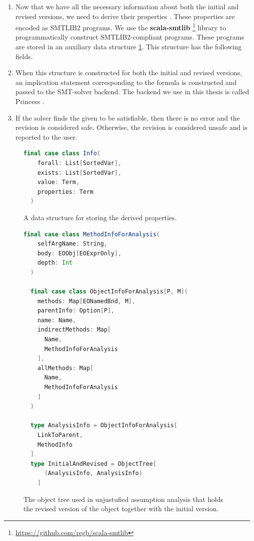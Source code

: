 \begin{enumerate}
  \item Now that we have all the necessary information about both the initial and revised versions, we need to derive their properties . These properties are encoded as SMTLIB2 \cite{smtlib} programs. We use the \textbf{scala-smtlib} \footnote{\url{https://github.com/regb/scala-smtlib}} library to programmatically construct SMTLIB2-compliant programs. These programs are stored in an auxiliary data structure \ref{fig:property_structure}. This structure has the following fields.
  \item When this structure is constructed for both the initial and revised versions, an implication statement corresponding to the formula  is constructed and passed to the SMT-solver backend. The backend we use in this thesis is called Princess \cite{princess}.
  \item If the solver finds the given to be satisfiable, then there is no error and the revision is considered safe. Otherwise, the revision is considered unsafe and is reported to the user. 
\end{enumerate}

\begin{figure}
\begin{lstlisting}[language=Scala]
  final case class Info(
    forall: List[SortedVar],
    exists: List[SortedVar],
    value: Term,
    properties: Term
  )
\end{lstlisting}
\caption{A data structure for storing the derived properties.}
\label{fig:property_structure}
\end{figure}

\begin{figure}
\begin{lstlisting}[language=Scala]
  final case class MethodInfoForAnalysis(
    selfArgName: String,
    body: EOObj[EOExprOnly],
    depth: Int
  )

  final case class ObjectInfoForAnalysis[P, M](
    methods: Map[EONamedBnd, M],
    parentInfo: Option[P],
    name: Name,
    indirectMethods: Map[
      Name, 
      MethodInfoForAnalysis
    ],
    allMethods: Map[
      Name, 
      MethodInfoForAnalysis
    ]
  )

  type AnalysisInfo = ObjectInfoForAnalysis[
    LinkToParent,
    MethodInfo
  ]
  type InitialAndRevised = ObjectTree[
      (AnalysisInfo, AnalysisInfo)
    ]
\end{lstlisting}
\caption{The object tree used in unjustufied assumption analysis that holds the revised version of the object together with the initial version.}
\label{fig:zipwithinlined}
\end{figure}
